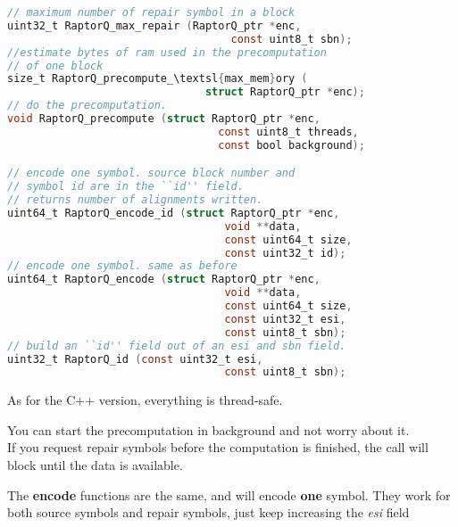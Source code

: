 \documentclass[11pt,a4paper]{refart}
\begin{document}

\begin{lstlisting}[language=C]
// maximum number of repair symbol in a block
uint32_t RaptorQ_max_repair (RaptorQ_ptr *enc,
                                   const uint8_t sbn);
//estimate bytes of ram used in the precomputation
// of one block
size_t RaptorQ_precompute_\textsl{max_mem}ory (
                               struct RaptorQ_ptr *enc);
// do the precomputation.
void RaptorQ_precompute (struct RaptorQ_ptr *enc,
                                 const uint8_t threads,
                                 const bool background);

// encode one symbol. source block number and
// symbol id are in the ``id'' field.
// returns number of alignments written.
uint64_t RaptorQ_encode_id (struct RaptorQ_ptr *enc,
                                  void **data,
                                  const uint64_t size,
                                  const uint32_t id);
// encode one symbol. same as before
uint64_t RaptorQ_encode (struct RaptorQ_ptr *enc,
                                  void **data,
                                  const uint64_t size,
                                  const uint32_t esi,
                                  const uint8_t sbn);
// build an ``id'' field out of an esi and sbn field.
uint32_t RaptorQ_id (const uint32_t esi,
                                  const uint8_t sbn);
\end{lstlisting}
As for the C++ version, everything is thread-safe.

You can start the precomputation in background and not worry about it.\\
If you request repair symbols before the computation is finished, the call will block until the data is available.

The \textbf{encode} functions are the same, and will encode \textbf{one} symbol.
They work for both source symbols and repair symbols, just keep increasing the \textit{esi} field


\newpage
\end{document}
